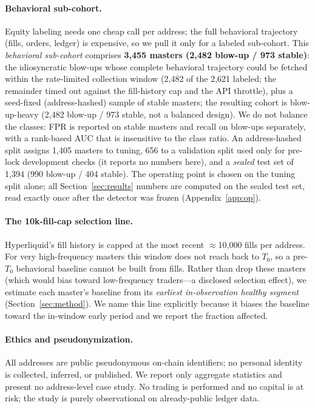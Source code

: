 \documentclass[11pt,a4paper]{article}
\newcommand{\Tnull}{T_{0}}
\begin{document}
\paragraph{Behavioral sub-cohort.}
Equity labeling needs one cheap call per address; the full behavioral trajectory
(fills, orders, ledger) is expensive, so we pull it only for a labeled sub-cohort.
This \emph{behavioral sub-cohort} comprises \textbf{3{,}455 masters (2{,}482
blow-up / 973 stable)}: the idiosyncratic blow-ups whose complete behavioral
trajectory could be fetched within the rate-limited collection window (2{,}482 of
the 2{,}621 labeled; the remainder timed out against the fill-history cap and the
API throttle), plus a seed-fixed (address-hashed) sample of stable masters; the
resulting cohort is blow-up-heavy (2{,}482 blow-up / 973 stable, not a balanced
design). We do not balance the classes: FPR is reported on stable masters and recall
on blow-ups separately, with a rank-based AUC that is insensitive to the class ratio.
An address-hashed split assigns 1{,}405 masters to tuning, 656 to a validation split
used only for pre-lock development checks (it reports no numbers here), and a
\emph{sealed} test set of 1{,}394 (990 blow-up / 404 stable). The operating point is chosen on the tuning split
alone; all Section~\ref{sec:results} numbers are computed on the sealed test set,
read exactly once after the detector was frozen (Appendix~\ref{app:op}).

\paragraph{The 10k-fill-cap selection line.}
Hyperliquid's fill history is capped at the most recent $\approx$10{,}000 fills per
address. For very high-frequency masters this window does not reach back to
$\Tnull$, so a pre-$\Tnull$ behavioral baseline cannot be built from fills. Rather
than drop these masters (which would bias toward low-frequency traders---a
disclosed selection effect), we estimate each master's baseline from its
\emph{earliest in-observation healthy segment} (Section~\ref{sec:method}). We name
this line explicitly because it biases the baseline toward the in-window early
period and we report the fraction affected.

\paragraph{Ethics and pseudonymization.}
All addresses are public pseudonymous on-chain identifiers; no personal identity is
collected, inferred, or published. We report only aggregate statistics and present
no address-level case study. No trading is performed and no capital is at
risk; the study is purely observational on already-public ledger data.
\end{document}
